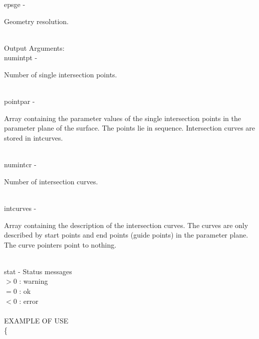         \>\>    {\fov epsge}\> - \>     \begin{minipg2}
                                Geometry resolution.
                                \end{minipg2}
\newpagetabs
\\
        \>Output Arguments:\\
        \>\>    {\fov numintpt}\> - \>  \begin{minipg2}
                                Number of single intersection points.
                                \end{minipg2}\\
        \>\>    {\fov pointpar}\> - \>  \begin{minipg2}
                                Array containing the parameter values of the single
                                intersection points in the parameter plane of the
                                surface. The points lie in sequence. Intersection curves
                                are stored in intcurves.
                                \end{minipg2}\\[0.8ex]
        \>\>    {\fov numintcr}\> - \>  \begin{minipg2}
                                Number of intersection curves.
                                \end{minipg2}\\
        \>\>    {\fov intcurves}\> - \> \begin{minipg2}
                                Array containing the description of the intersection
                                curves. The curves are only described by
                                start points and end points (guide points) in
                                the parameter plane. The curve pointers point to
                                nothing.
                                \end{minipg2}\\[0.3ex]
        \>\>    {\fov stat}     \> - \> Status messages\\
                \>\>\>\>\>              $> 0$   : warning\\
                \>\>\>\>\>              $= 0$   : ok\\
                \>\>\>\>\>              $< 0$   : error\\
\\
EXAMPLE OF USE\\
                \>      \{ \\

